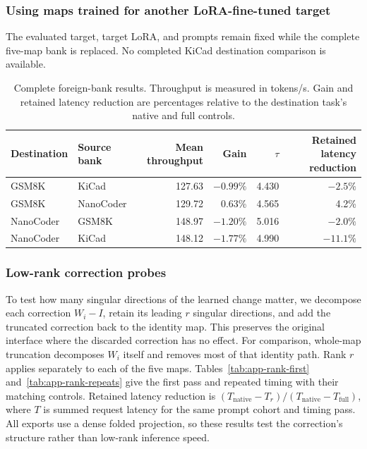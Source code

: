 \subsubsection{Using maps trained for another LoRA-fine-tuned target}

The evaluated target, target LoRA, and prompts remain fixed while the complete five-map bank is replaced. No completed KiCad destination comparison is available.

\begin{table}[ht!]
\centering
\caption{Complete foreign-bank results. Throughput is measured in tokens/s. Gain and retained latency reduction are percentages relative to the destination task's native and full controls.}
\label{tab:app-bank-swap}
\small
\begin{tabular}{llrrrr}
\toprule
Destination & Source bank & Mean throughput & Gain & $\tau$ & Retained latency reduction \\
\midrule
GSM8K & KiCad & 127.63 & $-0.99\%$ & 4.430 & $-2.5\%$ \\
GSM8K & NanoCoder & 129.72 & 0.63\% & 4.565 & 4.2\% \\
NanoCoder & GSM8K & 148.97 & $-1.20\%$ & 5.016 & $-2.0\%$ \\
NanoCoder & KiCad & 148.12 & $-1.77\%$ & 4.990 & $-11.1\%$ \\
\bottomrule
\end{tabular}
\end{table}

\subsubsection{Low-rank correction probes}
\label{app:low-rank-corrections}

To test how many singular directions of the learned change matter, we decompose each correction $W_i-I$, retain its leading $r$ singular directions, and add the truncated correction back to the identity map. This preserves the original interface where the discarded correction has no effect. For comparison, whole-map truncation decomposes $W_i$ itself and removes most of that identity path. Rank $r$ applies separately to each of the five maps. Tables~\ref{tab:app-rank-first} and~\ref{tab:app-rank-repeats} give the first pass and repeated timing with their matching controls. Retained latency reduction is $(T_{\mathrm{native}}-T_r)/(T_{\mathrm{native}}-T_{\mathrm{full}})$, where $T$ is summed request latency for the same prompt cohort and timing pass. All exports use a dense folded projection, so these results test the correction's structure rather than low-rank inference speed.

